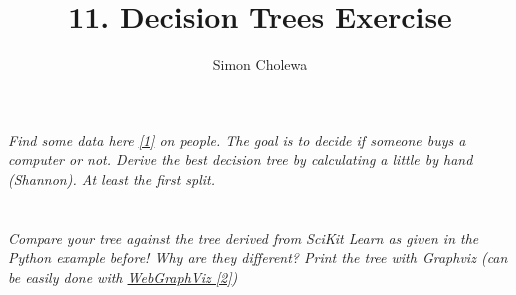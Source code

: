 \documentclass[11pt,a4paper]{article}
\author{Simon Cholewa}
\title{11. Decision Trees Exercise}
\begin{document}
\maketitle

\section{}

\textit{Find some data here \hyperref{https://drive.google.com/open?id=1E3bFrHnMGGmBgyAk9vAVnHGpQ8Z_asOP}{}{}{[1]} on people. The goal is to decide if someone buys a computer or not. Derive the best decision tree by calculating a little by hand (Shannon). At least the first split. }


\section{}

\textit{Compare your tree against the tree derived from SciKit Learn as given in the Python example before! Why are they different? Print the tree with Graphviz (can be easily done with \hyperref{http://www.webgraphviz.com/}{category}{name}{WebGraphViz [2]})}
\end{document}
